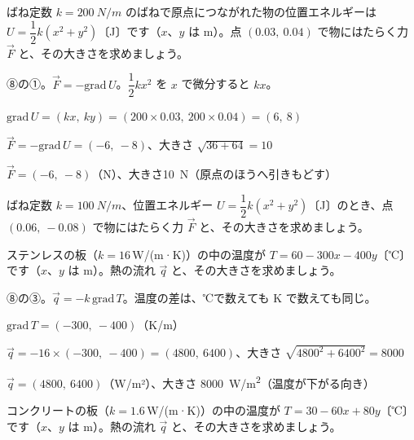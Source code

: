 \begin{reidai}[位置エネルギーから力を求める]
ばね定数 $k=\qty{200}{N/m}$ のばねで原点につながれた物の位置エネルギーは $U=\dfrac12k(x^2+y^2)$〔J〕です（$x$、$y$ は m）。点 $(0.03,\ 0.04)$ で物にはたらく力 $\vec F$ と、その大きさを求めましょう。\par
\kangaekata ⑧の①。$\vec F=-\mathrm{grad}\,U$。$\dfrac12kx^2$ を $x$ で微分すると $kx$。\par
\shiki\kviiies{}\zw{} $\mathrm{grad}\,U=(kx,\ ky)=(200\times0.03,\ 200\times0.04)=(6,\ 8)$\par
\kviiiea $\vec F=-\mathrm{grad}\,U=(-6,\ -8)$、大きさ $\sqrt{36+64}=10$\par
\kotae\kviiies{}\zw{} $\vec F=(-6,\ -8)$（N）、大きさ\qty{10}{N}（原点のほうへ引きもどす）
\end{reidai}

\begin{jibun}
ばね定数 $k=\qty{100}{N/m}$、位置エネルギー $U=\dfrac12k(x^2+y^2)$〔J〕のとき、点 $(0.06,\ -0.08)$ で物にはたらく力 $\vec F$ と、その大きさを求めましょう。
\end{jibun}

\begin{reidai}[温度の地図から熱の流れを求める]
ステンレスの板（$k=16$\,W/(m·K)）の中の温度が $T=60-300x-400y$〔℃〕です（$x$、$y$ は m）。熱の流れ $\vec q$ と、その大きさを求めましょう。\par
\kangaekata ⑧の③。$\vec q=-k\,\mathrm{grad}\,T$。温度の差は、℃で数えても K で数えても同じ。\par
\shiki\kviiies{}\zw{} $\mathrm{grad}\,T=(-300,\ -400)$（K/m）\par
\kviiiea $\vec q=-16\times(-300,\ -400)=(\num{4800},\ \num{6400})$、大きさ $\sqrt{4800^2+6400^2}=\num{8000}$\par
\kotae\kviiies{}\zw{} $\vec q=(\num{4800},\ \num{6400})$（W/m²）、大きさ \qty{8000}{W/m^2}（温度が下がる向き）
\end{reidai}

\begin{jibun}
コンクリートの板（$k=1.6$\,W/(m·K)）の中の温度が $T=30-60x+80y$〔℃〕です（$x$、$y$ は m）。熱の流れ $\vec q$ と、その大きさを求めましょう。
\end{jibun}

